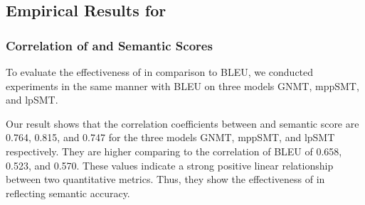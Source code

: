 \subsection{Empirical Results for {\model}}
\subsubsection{Correlation of {\model} and Semantic Scores}
To evaluate the effectiveness of {\model} in comparison to BLEU, we
conducted experiments in the same manner with BLEU on three models
GNMT, mppSMT, and lpSMT.

%

Our result shows that the correlation coefficients between {\model}
and semantic score are 0.764, 0.815, and 0.747 for the three models
GNMT, mppSMT, and lpSMT respectively. They are higher comparing to the
correlation of BLEU of 0.658, 0.523, and 0.570.
These values indicate a strong positive linear relationship between
two quantitative metrics. Thus, they show the effectiveness of
{\model} in reflecting semantic accuracy.



